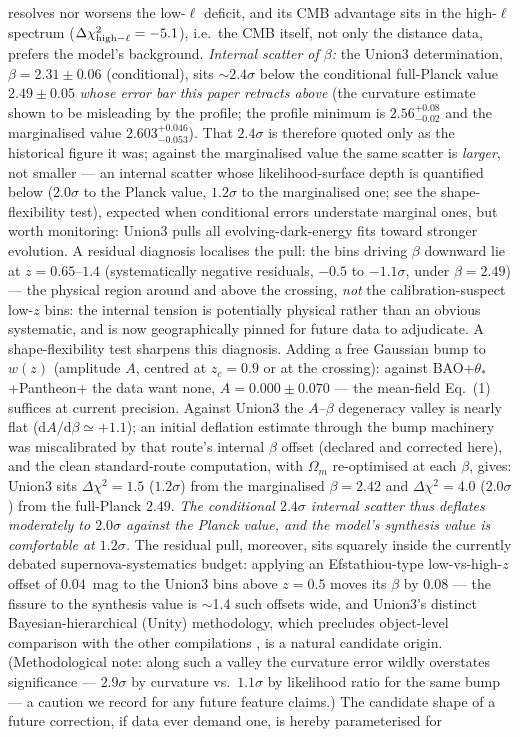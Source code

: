 \documentclass[11pt]{article}
\begin{document}
resolves nor worsens the low-$\ell$ deficit, and its CMB advantage sits in the high-$\ell$ spectrum ($\Delta\chi^2_{\rm high-\ell} = -5.1$), i.e.\ the CMB itself, not only the distance data, prefers the model's background. \emph{Internal scatter of $\beta$:} the Union3 determination, $\beta = 2.31 \pm 0.06$ (conditional), sits $\sim2.4\sigma$ below the conditional full-Planck value $2.49 \pm 0.05$ \emph{whose error bar this paper retracts above} (the curvature estimate shown to be misleading by the profile; the profile minimum is $2.56^{+0.08}_{-0.02}$ and the marginalised value $2.603^{+0.046}_{-0.053}$). That $2.4\sigma$ is therefore quoted only as the historical figure it was; against the marginalised value the same scatter is \emph{larger}, not smaller --- an internal scatter whose likelihood-surface depth is quantified below ($2.0\sigma$ to the Planck value, $1.2\sigma$ to the marginalised one; see the shape-flexibility test), expected when conditional errors understate marginal ones, but worth monitoring: Union3 pulls all evolving-dark-energy fits toward stronger evolution. A residual diagnosis localises the pull: the bins driving $\beta$ downward lie at $z = 0.65$--$1.4$ (systematically negative residuals, $-0.5$ to $-1.1\sigma$, under $\beta = 2.49$) --- the physical region around and above the crossing, \emph{not} the calibration-suspect low-$z$ bins: the internal tension is potentially physical rather than an obvious systematic, and is now geographically pinned for future data to adjudicate. A shape-flexibility test sharpens this diagnosis. Adding a free Gaussian bump to $w(z)$ (amplitude $A$, centred at $z_c = 0.9$ or at the crossing): against BAO+$\theta_*$+Pantheon+ the data want none, $A = 0.000 \pm 0.070$ --- the mean-field Eq.~(1) suffices at current precision. Against Union3 the $A$--$\beta$ degeneracy valley is nearly flat ($\mathrm{d}A/\mathrm{d}\beta \simeq +1.1$); an initial deflation estimate through the bump machinery was miscalibrated by that route's internal $\beta$ offset (declared and corrected here), and the clean standard-route computation, with $\Omega_m$ re-optimised at each $\beta$, gives: Union3 sits $\Delta\chi^2 = 1.5$ ($1.2\sigma$) from the marginalised $\beta = 2.42$ and $\Delta\chi^2 = 4.0$ ($2.0\sigma$) from the full-Planck $2.49$. \emph{The conditional $2.4\sigma$ internal scatter thus deflates moderately to $2.0\sigma$ against the Planck value, and the model's synthesis value is comfortable at $1.2\sigma$.} The residual pull, moreover, sits squarely inside the currently debated supernova-systematics budget: applying an Efstathiou-type low-vs-high-$z$ offset of $0.04$~mag \cite{Efstathiou2024} to the Union3 bins above $z=0.5$ moves its $\beta$ by $0.08$ --- the fissure to the synthesis value is $\sim$1.4 such offsets wide, and Union3's distinct Bayesian-hierarchical (Unity) methodology, which precludes object-level comparison with the other compilations \cite{Vincenzi2025}, is a natural candidate origin. (Methodological note: along such a valley the curvature error wildly overstates significance --- $2.9\sigma$ by curvature vs.\ $1.1\sigma$ by likelihood ratio for the same bump --- a caution we record for any future feature claims.) The candidate shape of a future correction, if data ever demand one, is hereby parameterised for 
\end{document}
